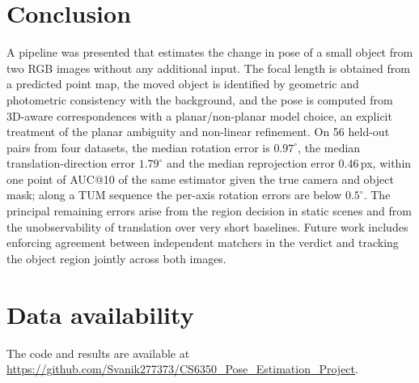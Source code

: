 \documentclass[10pt,a4paper,twocolumn]{article}
\begin{document}
\section{Conclusion}
A pipeline was presented that estimates the change in pose of a small object from two RGB images without any additional input. The focal length is obtained from a predicted point map, the moved object is identified by geometric and photometric consistency with the background, and the pose is computed from 3D-aware correspondences with a planar/non-planar model choice, an explicit treatment of the planar ambiguity and non-linear refinement. On 56 held-out pairs from four datasets, the median rotation error is $0.97^\circ$, the median translation-direction error $1.79^\circ$ and the median reprojection error 0.46\,px, within one point of AUC@10 of the same estimator given the true camera and object mask; along a TUM sequence the per-axis rotation errors are below $0.5^\circ$. The principal remaining errors arise from the region decision in static scenes and from the unobservability of translation over very short baselines. Future work includes enforcing agreement between independent matchers in the verdict and tracking the object region jointly across both images.

\section*{Data availability}
The code and results are available at\\ \url{https://github.com/Svanik277373/CS6350_Pose_Estimation_Project}.
\end{document}
